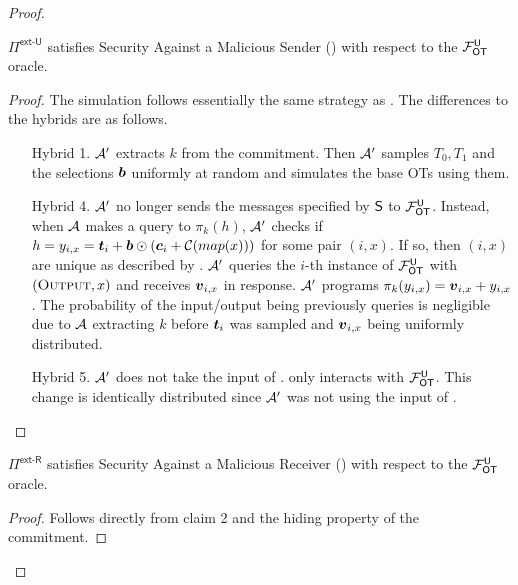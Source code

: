 \begin{proof}\label{proof:ext_U_U}
	\begin{claim}\label{claim:ext-U-U-MalSender}
		$\Pi^{\textsf{ext-U}}$ satisfies Security Against a Malicious Sender () with respect to the $\OOT^\U$ oracle.
	\end{claim}
	\begin{proof}
		The simulation follows essentially the same strategy as .
		The differences to the hybrids are as follows.
		\begin{enumerate}[leftmargin=1.8cm]
			\item[Hybrid 1.] $\Adv'$ extracts $k$ from the commitment. Then $\Adv'$ samples $T_0,T_1$ and the selections $\bb$ uniformly at random and simulates the base OTs using them.
			
			\item[Hybrid 4.] $\Adv'$ no longer sends the messages specified by $\send$ to $\OOT^\U$. Instead, when $\Adv$ makes a query to $\pi_k(h)$, $\Adv'$ checks if $h=y_{i,x}=\tt_i +\bb\odot( \cc_i + \mathcal{C}(map(x)))$ for some pair $(i,x)$. If so, then $(i,x)$ are unique as described by . $\Adv'$ queries the $i$-th instance of $\OOT^\U$ with $(\textsc{Output}, x)$ and receives $\vv_{i,x}$ in response. $\Adv'$ programs $\pi_k(y_{i,x})=\vv_{i,x}+y_{i,x}$. The probability of the input/output being previously queries is negligible due to $\Adv$ extracting $k$ before $\tt_i$ was sampled and $\vv_{i,x}$ being uniformly distributed.
			
			\item[Hybrid 5.] $\Adv'$ does not take the input of \rec. \rec only interacts with $\OOT^\U$. This change is identically distributed since $\Adv'$ was not using the input of \rec.
		\end{enumerate}
	\end{proof}
	\begin{claim}\label{claim:ext-U-U-MalReceiver}
		$\Pi^{\textsf{ext-R}}$ satisfies Security Against a Malicious Receiver () with respect to the $\OOT^\U$ oracle.
	\end{claim}
	\begin{proof}
		Follows directly from  claim 2 and the hiding property of the commitment. 
	\end{proof}
	
\end{proof}